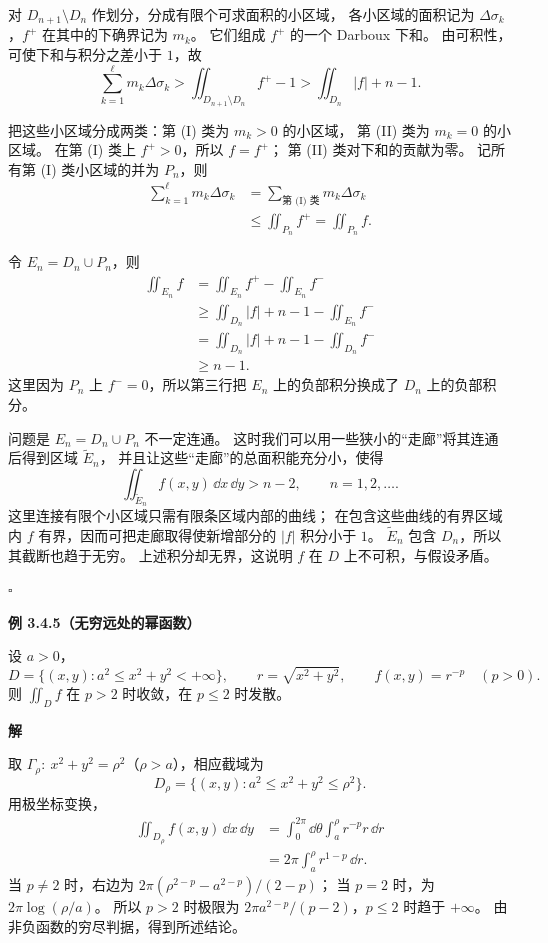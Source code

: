 对 $D_{n+1}\setminus D_n$ 作划分，分成有限个可求面积的小区域，
各小区域的面积记为 $\Delta\sigma_k$，$f^+$ 在其中的下确界记为 $m_k$。
它们组成 $f^+$ 的一个 Darboux 下和。
由可积性，可使下和与积分之差小于 $1$，故
\[
\sum_{k=1}^{\ell}m_k\Delta\sigma_k
>\displaystyle\iint_{D_{n+1}\setminus D_n}f^+-1
>\displaystyle\iint_{D_n}|f|+n-1.
\]

把这些小区域分成两类：第 (I) 类为 $m_k>0$ 的小区域，
第 (II) 类为 $m_k=0$ 的小区域。
在第 (I) 类上 $f^+>0$，所以 $f=f^+$；
第 (II) 类对下和的贡献为零。
记所有第 (I) 类小区域的并为 $P_n$，则
\begin{align*}
\sum_{k=1}^{\ell}m_k\Delta\sigma_k
&=\sum_{\text{第 (I) 类}}m_k\Delta\sigma_k\\
&\le\displaystyle\iint_{P_n}f^+
=\displaystyle\iint_{P_n}f.
\end{align*}

令 $E_n=D_n\cup P_n$，则
\begin{align*}
\displaystyle\iint_{E_n}f
&=\displaystyle\iint_{E_n}f^+-\displaystyle\iint_{E_n}f^-\\
&\ge\displaystyle\iint_{D_n}|f|+n-1-\displaystyle\iint_{E_n}f^-\\
&=\displaystyle\iint_{D_n}|f|+n-1-\displaystyle\iint_{D_n}f^-\\
&\ge n-1.
\end{align*}
这里因为 $P_n$ 上 $f^-=0$，所以第三行把 $E_n$ 上的负部积分换成了 $D_n$ 上的负部积分。

问题是 $E_n=D_n\cup P_n$ 不一定连通。
这时我们可以用一些狭小的“走廊”将其连通后得到区域 $\widetilde E_n$，
并且让这些“走廊”的总面积能充分小，使得
\[
\displaystyle\iint_{\widetilde E_n}f(x,y)\,\dd x\,\dd y>n-2,
\qquad n=1,2,\ldots.
\]
这里连接有限个小区域只需有限条区域内部的曲线；
在包含这些曲线的有界区域内 $f$ 有界，因而可把走廊取得使新增部分的 $|f|$ 积分小于 $1$。
$\widetilde E_n$ 包含 $D_n$，所以其截断也趋于无穷。
上述积分却无界，这说明 $f$ 在 $D$ 上不可积，与假设矛盾。


$\square$






\textbf{例 3.4.5（无穷远处的幂函数）}


设 $a>0$，
\[
D=\{(x,y):a^2\le x^2+y^2<+\infty\},\qquad
r=\sqrt{x^2+y^2},\qquad f(x,y)=r^{-p}\quad(p>0).
\]
则 $\displaystyle\iint_Df$ 在 $p>2$ 时收敛，在 $p\le2$ 时发散。





\textbf{解}

取 $\Gamma_\rho:\ x^2+y^2=\rho^2$（$\rho>a$），相应截域为
\[
D_\rho=\{(x,y):a^2\le x^2+y^2\le\rho^2\}.
\]
用极坐标变换，
\begin{align*}
\displaystyle\iint_{D_\rho}f(x,y)\,\dd x\,\dd y
&=\int_0^{2\pi}\dd\theta\int_a^\rho r^{-p}r\,\dd r\\
&=2\pi\int_a^\rho r^{1-p}\,\dd r.
\end{align*}
当 $p\ne2$ 时，右边为 $2\pi(\rho^{2-p}-a^{2-p})/(2-p)$；
当 $p=2$ 时，为 $2\pi\log(\rho/a)$。
所以 $p>2$ 时极限为 $2\pi a^{2-p}/(p-2)$，$p\le2$ 时趋于 $+\infty$。
由非负函数的穷尽判据，得到所述结论。






